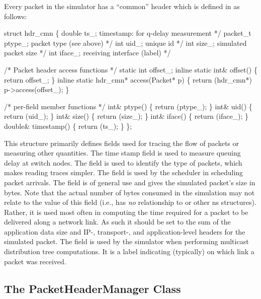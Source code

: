 Every packet in the simulator has a ``common''
header which is defined in  as follows:
\begin{program}
        struct hdr_cmn \{
                double    ts_;            \* timestamp: for q-delay measurement */
                packet_t  ptype_;         \* packet type (see above) */
                int       uid_;           \* unique id */
                int       size_;          \* simulated packet size */
                int       iface_;         \* receiving interface (label) */
         
                /* {\cf Packet header access functions} */
                static int offset_;
                inline static int& offset() \{ return offset_; \}
                inline static hdr_cmn* access(Packet* p) \{
                        return (hdr_cmn*) p->access(offset_);
                \}

                /* {\cf per-field member functions} */
                int& ptype() \{ return (ptype_); \}
                int& uid() \{ return (uid_); \}
                int& size() \{ return (size_); \}
                int& iface() \{ return (iface_); \}
                double& timestamp() \{ return (ts_); \}
        \};
\end{program}
This structure primarily defines fields used for tracing
the flow of packets or measuring other quantities.
The time stamp field is used to measure queuing delay
at switch nodes.
The  field is used to identify the
type of packets, which makes reading traces simpler.
The  field is used by the scheduler in scheduling
packet arrivals.
The  field is of general use and gives the
simulated packet's size in bytes.
Note that the actual number of bytes consumed in the simulation
may not relate to the value of this field
  (i.e.,  has \emph{no} relationship
  to  or other ns structures).
Rather, it is used most often in computing the time required for a packet
to be delivered along a network link.
As such it should be set to the sum of the
  application data size
  and IP-, transport-, and application-level headers
  for the simulated packet.
The  field is used by the simulator when performing
multicast distribution tree computations.
It is a label indicating (typically) on which link a packet was received.

\subsection{The PacketHeaderManager Class}
\label{sec:packethdrmgr}

